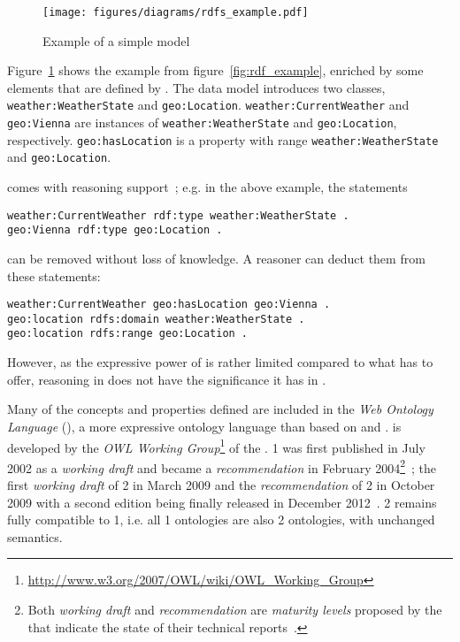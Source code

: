 \begin{figure}
\centering
\texttt{[image: figures/diagrams/rdfs\_example.pdf]}
\caption{Example of a simple  model}
\label{fig:rdfs_example}
\end{figure}

Figure~\ref{fig:rdfs_example} shows the example from figure~\ref{fig:rdf_example}, enriched by some elements that are defined by . The data model introduces two classes, \texttt{weather:WeatherState} and \texttt{geo:Location}. \texttt{weather:CurrentWeather} and \texttt{geo:Vienna} are instances of \texttt{weather:WeatherState} and \texttt{geo:Location}, respectively. \texttt{geo:hasLocation} is a property with range \texttt{weather:WeatherState} and \texttt{geo:Location}.

 comes with reasoning support~\cite{RDF_semantics}; e.g. in the above example, the statements

\begin{verbatim}
weather:CurrentWeather rdf:type weather:WeatherState .
geo:Vienna rdf:type geo:Location .
\end{verbatim}

can be removed without loss of knowledge. A reasoner can deduct them from these statements:

\begin{verbatim}
weather:CurrentWeather geo:hasLocation geo:Vienna .
geo:location rdfs:domain weather:WeatherState .
geo:location rdfs:range geo:Location .
\end{verbatim}
However, as the expressive power of  is rather limited compared to what  has to offer, reasoning in  does not have the significance it has in .

Many of the concepts and properties defined are included in the \emph{Web Ontology Language} (), a more expressive ontology language than  based on  and .  is developed by the \emph{OWL Working Group}\footnote{\href{http://www.w3.org/2007/OWL/wiki/OWL\_Working\_Group}{http://www.w3.org/2007/OWL/wiki/OWL\_Working\_Group}} of the .  1 was first published in July 2002 as a \emph{working draft} and became a  \emph{recommendation} in February 2004\footnote{Both \emph{working draft} and \emph{recommendation} are \emph{maturity levels} proposed by the  that indicate the state of their technical reports~\cite{w3c-process}.}~\cite{OWL1}; the first \emph{working draft} of  2 in March 2009 and the  \emph{recommendation} of  2 in October 2009 with a second edition being finally released in December 2012~\cite{OWL}.  2 remains fully compatible to  1, i.e. all  1 ontologies are also  2 ontologies, with unchanged semantics.

